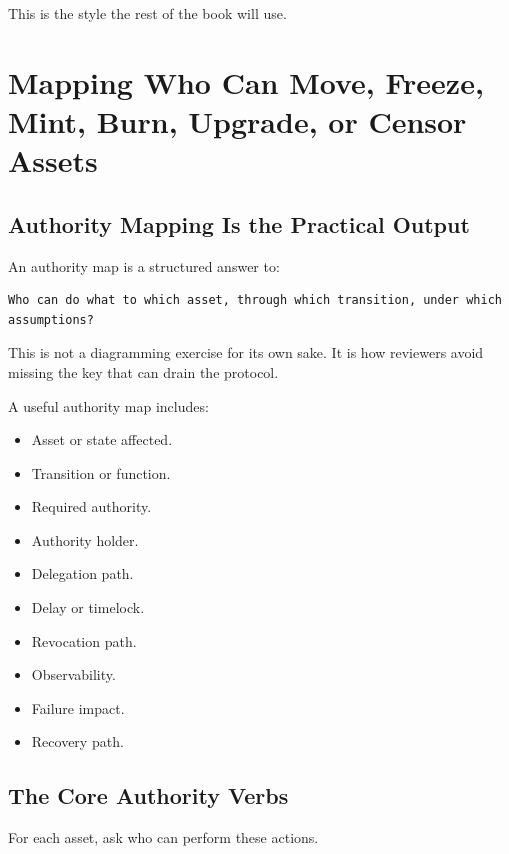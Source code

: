 This is the style the rest of the book will use.

\section{Mapping Who Can Move, Freeze, Mint, Burn, Upgrade, or Censor Assets}

\subsection{Authority Mapping Is the Practical Output}

An authority map is a structured answer to:

\begin{lstlisting}
Who can do what to which asset, through which transition, under which assumptions?
\end{lstlisting}

This is not a diagramming exercise for its own sake. It is how reviewers
avoid missing the key that can drain the protocol.

A useful authority map includes:

\begin{itemize}
\tightlist
\item
  Asset or state affected.
\item
  Transition or function.
\item
  Required authority.
\item
  Authority holder.
\item
  Delegation path.
\item
  Delay or timelock.
\item
  Revocation path.
\item
  Observability.
\item
  Failure impact.
\item
  Recovery path.
\end{itemize}

\subsection{The Core Authority Verbs}

For each asset, ask who can perform these actions.

